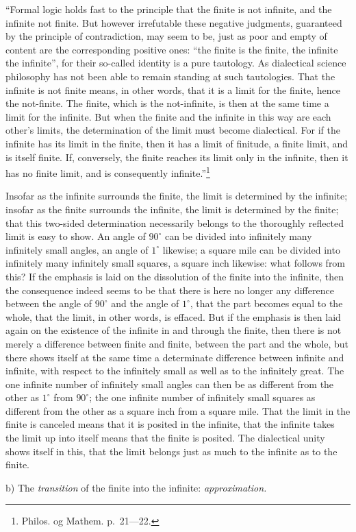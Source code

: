 \documentclass[12pt,a4paper,openany]{book}
\newcommand{\opage}[1]{\marginnote{\footnotesize\textit{[#1]}}}
\begin{document}
``Formal logic holds fast to the principle
that the finite is not infinite, and the infinite
not finite. But however irrefutable these negative judgments, guaranteed
by the principle of contradiction, may seem to
be, just as poor and empty of content are the corresponding positive ones:
``the finite is the finite, the infinite the infinite'',
for their so-called identity is a pure tautology. As
dialectical science philosophy has not been able to remain
standing at such tautologies. That the infinite is not
finite means, in other words, that it is a limit
for the finite, hence the not-finite. The finite,
which is the not-infinite, is then at the same time a limit
for the infinite. But when the finite and the infinite
in this way are each other's limits,
\setcounter{footnote}{0}%
\opage{33}the determination of the limit must become dialectical. For if the infinite has
its limit in the finite, then it has a limit of finitude,
a finite limit, and is itself finite.
If, conversely, the finite reaches its limit only in the infinite,
then it has no finite limit, and is consequently infinite.''\footnote[1]{Philos. og Mathem. p.\ 21—22.}

Insofar as the infinite surrounds the finite, the
limit is determined by the infinite; insofar as the finite
surrounds the infinite, the limit is determined by the finite;
that this two-sided determination necessarily belongs
to the thoroughly reflected limit is easy to show. An
angle of $90^{\circ}$ can be divided into infinitely many infinitely small
angles, an angle of $1^{\circ}$ likewise; a square mile can
be divided into infinitely many infinitely small squares, a square inch
likewise: what follows from this? If the emphasis is laid
on the dissolution of the finite into the infinite, then
the consequence indeed seems to be that there is here no longer any difference between
the angle of $90^{\circ}$ and the angle of $1^{\circ}$, that the part becomes
equal to the whole, that the limit, in other words, is effaced.
But if the emphasis is then laid again on the existence of the infinite
in and through the finite, then there is not merely a difference
between finite and finite, between the part and the
whole, but there shows itself at the same time a determinate difference
between infinite and infinite, with respect to the
infinitely small as well as to the infinitely great. The one infinite
number of infinitely small angles can then be as different
from the other as $1^{\circ}$ from $90^{\circ}$; the one infinite
number of infinitely small squares as different from the
other as a square inch from a square mile. That
the limit in the finite is canceled means that it is posited in
the infinite, that the infinite takes the limit up into itself
means that the finite is posited. The dialectical unity shows
itself in this, that the limit belongs just as much to the infinite
as to the finite.
\setcounter{footnote}{0}%
\opage{34}
\begin{center}b) The \emph{transition} of the finite into the infinite: \emph{approximation.}\end{center}
\end{document}

